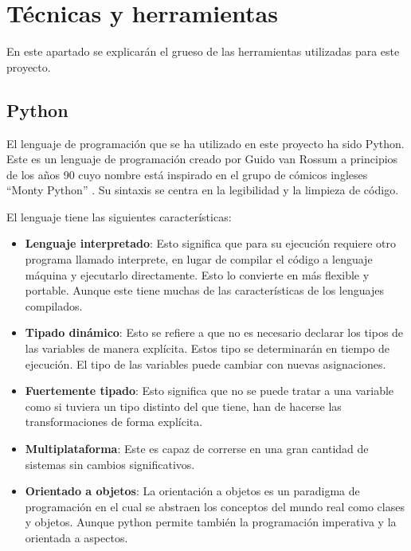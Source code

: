 \chapter{Técnicas y herramientas}

En este apartado se explicarán el grueso de las herramientas utilizadas para este proyecto.

\section{Python}
El lenguaje de programación que se ha utilizado en este proyecto ha sido Python. Este es un lenguaje de programación creado por Guido van Rossum a principios de los años 90 cuyo nombre está inspirado en el grupo de cómicos ingleses “Monty Python” \cite{gonzalez2011python}. Su sintaxis se centra en la legibilidad y la limpieza de código.

El lenguaje tiene las siguientes características:
\begin{itemize}
	\item\textbf{Lenguaje interpretado}: Esto significa que para su ejecución requiere otro programa llamado interprete, en lugar de compilar el código a lenguaje máquina y ejecutarlo directamente.
	Esto lo convierte en más flexible y portable. Aunque este tiene muchas de las características de los lenguajes compilados.
	
	\item\textbf{Tipado dinámico}: Esto se refiere a que no es necesario declarar los tipos de las variables de manera explícita. Estos tipo se determinarán en tiempo de ejecución. El tipo de las variables puede cambiar con nuevas asignaciones.
	
	\item\textbf{Fuertemente tipado}: Esto significa que  no se puede tratar a una variable como si tuviera un tipo distinto del que tiene, han de hacerse las transformaciones de forma explícita.
	
	\item\textbf{Multiplataforma}: Este es capaz de correrse en una gran cantidad de sistemas sin cambios significativos.
	
	\item\textbf{Orientado a objetos}: La orientación a objetos es un paradigma de programación en el cual se abstraen los conceptos del mundo real como clases y objetos. Aunque python permite también la programación imperativa y la orientada a aspectos.
	
\end{itemize}

